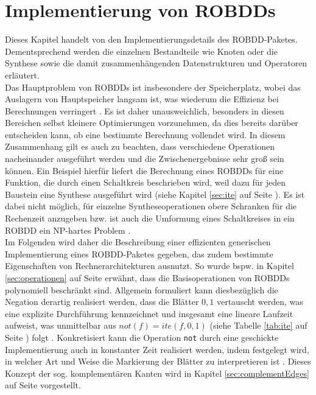 \newpage
\section{Implementierung von ROBDDs}
\label{sec:implementierung}
Dieses Kapitel handelt von den Implementierungsdetails des ROBDD-Paketes. Dementsprechend werden die einzelnen Bestandteile wie Knoten oder die Synthese sowie die damit zusammenhängenden Datenstrukturen und Operatoren erläutert.\\
Das Hauptproblem von ROBDDs ist insbesondere der Speicherplatz, wobei das Auslagern von Hauptspeicher langsam ist, was wiederum die Effizienz bei Berechnungen verringert \cite[S.37-45]{s2007}. Es ist daher unausweichlich, besonders in diesen Bereichen selbst kleinere Optimierungen vorzunehmen, da dies bereits darüber entscheiden kann, ob eine bestimmte Berechnung vollendet wird. In diesem Zusammenhang gilt es auch zu beachten, dass verschiedene Operationen nacheinander ausgeführt werden und die Zwischenergebnisse sehr groß sein können. Ein Beispiel hierfür liefert die Berechnung eines ROBDDs für eine Funktion, die durch einen Schaltkreis beschrieben wird, weil dazu für jeden Baustein eine Synthese ausgeführt wird (siehe Kapitel \ref{sec:ite} auf Seite \pageref{sec:ite}). Es ist dabei nicht möglich, für einzelne Syntheseoperationen obere Schranken für die Rechenzeit anzugeben bzw. ist auch die Umformung eines Schaltkreises in ein ROBDD ein NP-hartes Problem \cite[S.46]{s2007}.\\
Im Folgenden wird daher die Beschreibung einer effizienten generischen Implementierung eines ROBDD-Paketes gegeben, das zudem bestimmte Eigenschaften von Rechnerarchitekturen ausnutzt. So wurde bspw. in Kapitel \ref{sec:operationen} auf Seite \pageref{sec:operationen} erwähnt, dass die Basisoperationen von ROBDDs polynomiell beschränkt sind. Allgemein formuliert kann diesbezüglich die Negation derartig realisiert werden, dass die Blätter $0, 1$ vertauscht werden, was eine explizite Durchführung kennzeichnet und insgesamt eine lineare Laufzeit aufweist, was unmittelbar aus $not(f) = ite(f,0,1)$ (siehe Tabelle \ref{tab:ite} auf Seite \pageref{tab:ite}) folgt \cite{g2002}. Konkretisiert kann die Operation \texttt{not} durch eine geschickte Implementierung auch in konstanter Zeit realisiert werden, indem festgelegt wird, in welcher Art und Weise die Markierung der Blätter zu interpretieren ist \cite{miy1990}. Dieses Konzept der sog. komplementären Kanten wird in Kapitel \ref{sec:complementEdges} auf Seite \pageref{sec:complementEdges} vorgestellt.\\
